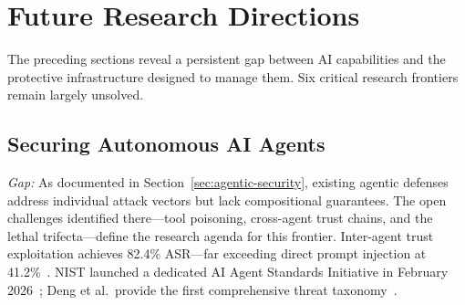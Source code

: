 
\section{Future Research Directions}
\label{sec:future}

The preceding sections reveal a persistent gap between AI capabilities and the protective infrastructure designed to manage them. Six critical research frontiers remain largely unsolved.


\subsection{Securing Autonomous AI Agents}
\label{sec:future-agents}


\emph{Gap:} As documented in Section~\ref{sec:agentic-security}, existing agentic defenses address individual attack vectors but lack compositional guarantees. The open challenges identified there---tool poisoning, cross-agent trust chains, and the lethal trifecta---define the research agenda for this frontier. Inter-agent trust exploitation achieves 82.4\% ASR---far exceeding direct prompt injection at 41.2\%~\cite{darkside2025agents}. NIST launched a dedicated AI Agent Standards Initiative in February 2026~\cite{nist2026agentstandards}; Deng et al.\ provide the first comprehensive threat taxonomy~\cite{deng2025agentthreat}.

